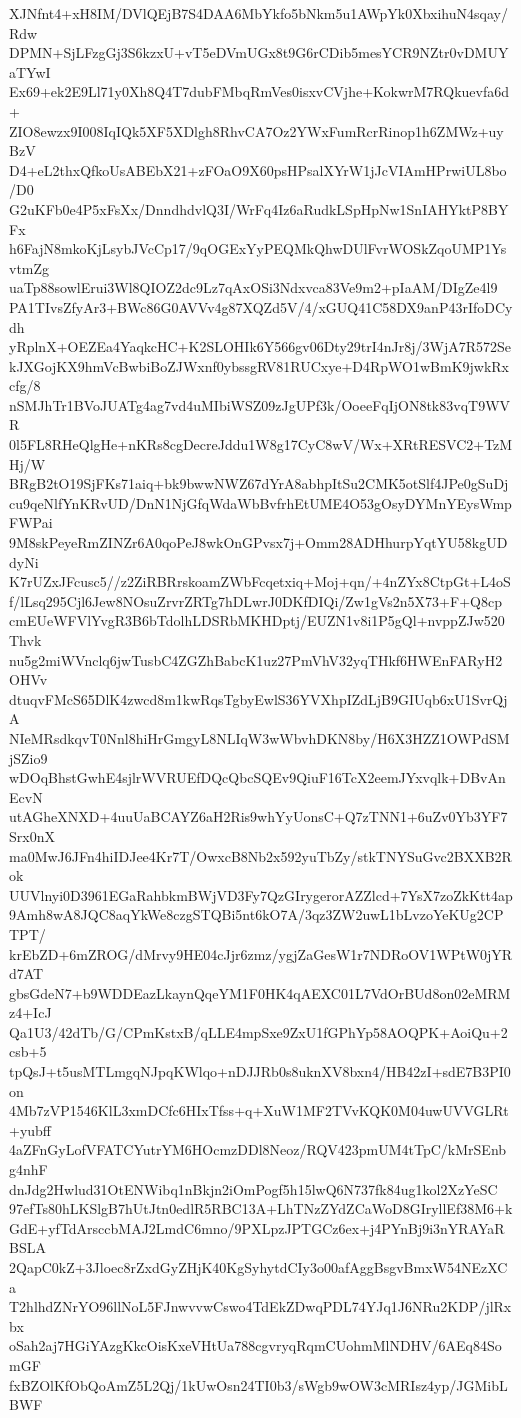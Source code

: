 XJNfnt4+xH8IM/DVlQEjB7S4DAA6MbYkfo5bNkm5u1AWpYk0XbxihuN4sqay/Rdw
DPMN+SjLFzgGj3S6kzxU+vT5eDVmUGx8t9G6rCDib5mesYCR9NZtr0vDMUYaTYwI
Ex69+ek2E9Ll71y0Xh8Q4T7dubFMbqRmVes0isxvCVjhe+KokwrM7RQkuevfa6d+
ZIO8ewzx9I008IqIQk5XF5XDlgh8RhvCA7Oz2YWxFumRcrRinop1h6ZMWz+uyBzV
D4+eL2thxQfkoUsABEbX21+zFOaO9X60psHPsalXYrW1jJcVIAmHPrwiUL8bo/D0
G2uKFb0e4P5xFsXx/DnndhdvlQ3I/WrFq4Iz6aRudkLSpHpNw1SnIAHYktP8BYFx
h6FajN8mkoKjLsybJVcCp17/9qOGExYyPEQMkQhwDUlFvrWOSkZqoUMP1YsvtmZg
uaTp88sowlErui3Wl8QIOZ2dc9Lz7qAxOSi3Ndxvca83Ve9m2+pIaAM/DIgZe4l9
PA1TIvsZfyAr3+BWc86G0AVVv4g87XQZd5V/4/xGUQ41C58DX9anP43rIfoDCydh
yRplnX+OEZEa4YaqkcHC+K2SLOHIk6Y566gv06Dty29trI4nJr8j/3WjA7R572Se
kJXGojKX9hmVcBwbiBoZJWxnf0ybssgRV81RUCxye+D4RpWO1wBmK9jwkRxcfg/8
nSMJhTr1BVoJUATg4ag7vd4uMIbiWSZ09zJgUPf3k/OoeeFqIjON8tk83vqT9WVR
0l5FL8RHeQlgHe+nKRs8cgDecreJddu1W8g17CyC8wV/Wx+XRtRESVC2+TzMHj/W
BRgB2tO19SjFKs71aiq+bk9bwwNWZ67dYrA8abhpItSu2CMK5otSlf4JPe0gSuDj
cu9qeNlfYnKRvUD/DnN1NjGfqWdaWbBvfrhEtUME4O53gOsyDYMnYEysWmpFWPai
9M8skPeyeRmZINZr6A0qoPeJ8wkOnGPvsx7j+Omm28ADHhurpYqtYU58kgUDdyNi
K7rUZxJFcusc5//z2ZiRBRrskoamZWbFcqetxiq+Moj+qn/+4nZYx8CtpGt+L4oS
f/lLsq295Cjl6Jew8NOsuZrvrZRTg7hDLwrJ0DKfDIQi/Zw1gVs2n5X73+F+Q8cp
cmEUeWFVlYvgR3B6bTdolhLDSRbMKHDptj/EUZN1v8i1P5gQl+nvppZJw520Thvk
nu5g2miWVnclq6jwTusbC4ZGZhBabcK1uz27PmVhV32yqTHkf6HWEnFARyH2OHVv
dtuqvFMcS65DlK4zwcd8m1kwRqsTgbyEwlS36YVXhpIZdLjB9GIUqb6xU1SvrQjA
NIeMRsdkqvT0Nnl8hiHrGmgyL8NLIqW3wWbvhDKN8by/H6X3HZZ1OWPdSMjSZio9
wDOqBhstGwhE4sjlrWVRUEfDQcQbcSQEv9QiuF16TcX2eemJYxvqlk+DBvAnEcvN
utAGheXNXD+4uuUaBCAYZ6aH2Ris9whYyUonsC+Q7zTNN1+6uZv0Yb3YF7Srx0nX
ma0MwJ6JFn4hiIDJee4Kr7T/OwxcB8Nb2x592yuTbZy/stkTNYSuGvc2BXXB2Rok
UUVlnyi0D3961EGaRahbkmBWjVD3Fy7QzGIrygerorAZZlcd+7YsX7zoZkKtt4ap
9Amh8wA8JQC8aqYkWe8czgSTQBi5nt6kO7A/3qz3ZW2uwL1bLvzoYeKUg2CPTPT/
krEbZD+6mZROG/dMrvy9HE04cJjr6zmz/ygjZaGesW1r7NDRoOV1WPtW0jYRd7AT
gbsGdeN7+b9WDDEazLkaynQqeYM1F0HK4qAEXC01L7VdOrBUd8on02eMRMz4+IcJ
Qa1U3/42dTb/G/CPmKstxB/qLLE4mpSxe9ZxU1fGPhYp58AOQPK+AoiQu+2csb+5
tpQsJ+t5usMTLmgqNJpqKWlqo+nDJJRb0s8uknXV8bxn4/HB42zI+sdE7B3PI0on
4Mb7zVP1546KlL3xmDCfc6HIxTfss+q+XuW1MF2TVvKQK0M04uwUVVGLRt+yubff
4aZFnGyLofVFATCYutrYM6HOcmzDDl8Neoz/RQV423pmUM4tTpC/kMrSEnbg4nhF
dnJdg2Hwlud31OtENWibq1nBkjn2iOmPogf5h15lwQ6N737fk84ug1kol2XzYeSC
97efTs80hLKSlgB7hUtJtn0edlR5RBC13A+LhTNzZYdZCaWoD8GIryllEf38M6+k
GdE+yfTdArsccbMAJ2LmdC6mno/9PXLpzJPTGCz6ex+j4PYnBj9i3nYRAYaRBSLA
2QapC0kZ+3Jloec8rZxdGyZHjK40KgSyhytdCIy3o00afAggBsgvBmxW54NEzXCa
T2hlhdZNrYO96llNoL5FJnwvvwCswo4TdEkZDwqPDL74YJq1J6NRu2KDP/jlRxbx
oSah2aj7HGiYAzgKkcOisKxeVHtUa788cgvryqRqmCUohmMlNDHV/6AEq84SomGF
fxBZOlKfObQoAmZ5L2Qj/1kUwOsn24TI0b3/sWgb9wOW3cMRIsz4yp/JGMibLBWF
